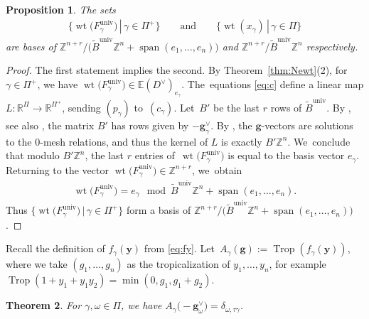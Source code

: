\documentclass[pdftex]{sigma}%
\def\R{{\mathbb R}}
\def\Z{{\mathbb Z}}
\def\univ{{\operatorname{univ}}}
\def\tB{{\tilde B}}
\def\sp{\operatorname{span}}
\def\wt{\operatorname{wt}}
\def\E{{\mathbb E}}
\def\tB{{\tilde B}}
\def\y{{\mathbf y}}
\def\Trop{\operatorname{Trop}}
\def\g{{\mathbf g}}
\numberwithin{equation}{section}
\newtheorem{Theorem}{Theorem}[section]
\newtheorem{Proposition}[Theorem]{Proposition}
\begin{document}
\begin{Proposition}\label{prop:wtbasis}
The sets \begin{gather*}
\big\{\wt\big(F^\univ_\gamma\big) \,|\, \gamma \in \Pi^+ \big\} \qquad \text{and} \qquad
\{\wt(x_\gamma) \,|\, \gamma \in \Pi\}
\end{gather*}
are bases of $\Z^{n+r}/\big(\tB^\univ \Z^n + \sp({e_1,\dots,e_n})\big)$ and $\Z^{n+r}/\tB^\univ \Z^n$ respectively.
\end{Proposition}
\begin{proof}
The first statement implies the second. By Theorem~\ref{thm:Newt}(2), for $\gamma \in \Pi^+$, we have $\wt\big(F^\univ_\gamma\big) \in \E(D^\vee)_{e_\gamma}$. The~equations \eqref{eq:c} define a linear map $L\colon \R^{\Pi} \to \R^{\Pi^+}$, sending $(p_\gamma)$ to~$(c_\gamma)$. Let~$B'$ be the last $r$ rows of $\tB^\univ$. By \cite{Reading}, see also \cite[Section~8]{BDMTY}, the matrix $B'$ has rows given by $-\g^\vee_\gamma$. By \cite[relation~(6.13)]{CA4}, the $\g$-vectors are solutions to the $0$-mesh relations, and thus the kernel of $L$ is exactly $B' \Z^n$. We~conclude that modulo $B'\Z^n$, the last $r$ entries of~$\wt\big(F^\univ_\gamma\big)$ is equal to the basis vector $e_\gamma$. Returning to the vector $\wt\big(F^\univ_\gamma\big) \in \Z^{n+r}$, we~obtain
\begin{gather*}
\wt\big(F^\univ_\gamma\big) = e_\gamma \mod \tB^\univ \Z^n + \sp({e_1,\dots,e_n}).
\end{gather*}
Thus
$\big\{\wt\big(F^\univ_\gamma\big) \,|\, \gamma \in \Pi^+\big\}$
form a basis of $\Z^{n+r}/\big(\tB^\univ \Z^n + \sp({e_1,\dots,e_n})\big)$.
\end{proof}

\bigskip{} %
Recall the definition of $f_\gamma(\y)$ from \eqref{eq:fy}. Let~$A_\gamma(\g):= \Trop(f_\gamma(\y))$, where we take $(g_1,\dots,g_n)$ as the tropicalization of $y_1,\dots,y_n$, for example $\Trop(1+y_1+y_1y_2) = \min(0,g_1,\allowbreak g_1+g_2)$.

\begin{Theorem}\label{thm:pair}
For $\gamma,\omega \in\Pi$, we have $A_\gamma\big({-}\g^\vee_\omega\big) = \delta_{\omega, \tau \gamma}$.
\end{Theorem}
\end{document}
